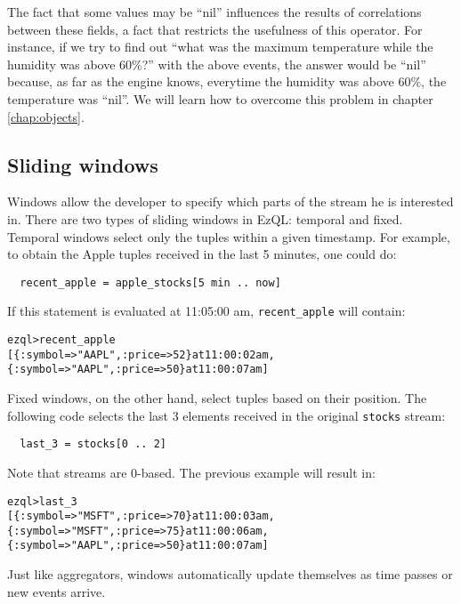 \documentclass{report}
\newenvironment{evaluation}
{
  \framed
  \begin{alltt}
}
{
  \end{alltt}
  \endframed
}
\begin{document}
The fact that some values may be ``nil'' influences the results of
correlations between these fields, a fact that restricts the
usefulness of this operator. For instance, if we try to find out
``what was the maximum temperature while the humidity was above
60\%?'' with the above events, the answer would be ``nil'' because, as
far as the engine knows, everytime the humidity was above 60\%, the
temperature was ``nil''. We will learn how to overcome this problem in
chapter \ref{chap:objects}.

\subsection{Sliding windows}
\label{sec:sliding-windows}

Windows allow the developer to specify which parts of the stream he is
interested in. There are two types of sliding windows in EzQL:
temporal and fixed. Temporal windows select only the tuples within a
given timestamp. For example, to obtain the Apple tuples received in
the last 5 minutes, one could do:

\begin{verbatim}
  recent_apple = apple_stocks[5 min .. now]
\end{verbatim}

If this statement is evaluated at 11:05:00 am, \verb=recent_apple=
will contain:

\begin{evaluation}
  ezql> recent_apple
  [\{ :symbol => "AAPL", :price => 52 \} at 11:00:02 am,
   \{ :symbol => "AAPL", :price => 50 \} at 11:00:07 am]
\end{evaluation}

Fixed windows, on the other hand, select tuples based on their
position. The following code selects the last 3 elements received in
the original \verb=stocks= stream:

\begin{verbatim}
  last_3 = stocks[0 .. 2]
\end{verbatim}

Note that streams are 0-based. The previous example will result in:

\begin{evaluation}
  ezql> last_3
  [\{ :symbol => "MSFT", :price => 70 \} at 11:00:03 am,
   \{ :symbol => "MSFT", :price => 75 \} at 11:00:06 am,
   \{ :symbol => "AAPL", :price => 50 \} at 11:00:07 am]
\end{evaluation}

Just like aggregators, windows automatically update themselves as time
passes or new events arrive.
\end{document}
